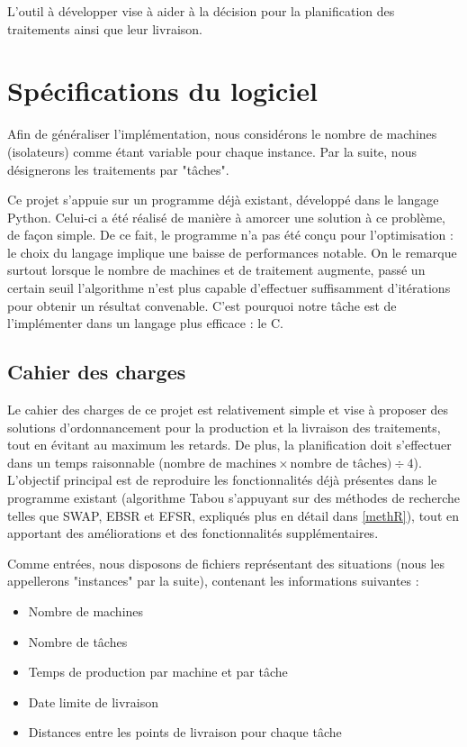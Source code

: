 \documentclass[hideweeklyreports]{polytech/polytech}
\begin{document}
		L'outil à développer vise à aider à la décision pour la planification des traitements ainsi que leur livraison.
		
	\chapter{Spécifications du logiciel}
		Afin de généraliser l'implémentation, nous considérons le nombre de machines (isolateurs) comme étant variable pour chaque instance. Par la suite, nous désignerons les traitements par "tâches".
		
		Ce projet s'appuie sur un programme déjà existant, développé dans le langage Python. Celui-ci a été réalisé de manière à amorcer une solution à ce problème, de façon simple. De ce fait, le programme n'a pas été conçu pour l'optimisation : le choix du langage implique une baisse de performances notable. On le remarque surtout lorsque le nombre de machines et de traitement augmente, passé un certain seuil l'algorithme n'est plus capable d'effectuer suffisamment d'itérations pour obtenir un résultat convenable. C'est pourquoi notre tâche est de l'implémenter dans un langage plus efficace : le C.
		\section{Cahier des charges}
			Le cahier des charges de ce projet est relativement simple et vise à proposer des solutions d'ordonnancement pour la production et la livraison des traitements, tout en évitant au maximum les retards. De plus, la planification doit s'effectuer dans un temps raisonnable ($\text{nombre de machines}\times \text{nombre de tâches})\div 4$). L'objectif principal est de reproduire les fonctionnalités déjà présentes dans le programme existant (algorithme Tabou s'appuyant sur des méthodes de recherche telles que SWAP, EBSR et EFSR, expliqués plus en détail dans \autoref{methR}), tout en apportant des améliorations et des fonctionnalités supplémentaires.
			
			Comme entrées, nous disposons de fichiers représentant des situations (nous les appellerons "instances" par la suite), contenant les informations suivantes :
			\begin{itemize}
				\item Nombre de machines
				\item Nombre de tâches
				\item Temps de production par machine et par tâche
				\item Date limite de livraison
				\item Distances entre les points de livraison pour chaque tâche
			\end{itemize}
			
\end{document}
